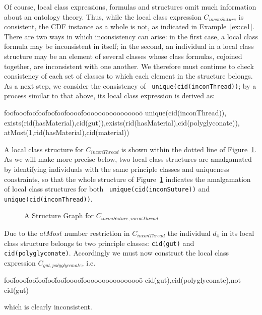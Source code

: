 \begin{example}
Of course, local class expressions, formulas and structures omit much
information about an ontology theory.  Thus, while the local class
expression $C_{inconSuture}$ is consistent, the CDF instance as a
whole is not, as indicated in Example~\ref{ex:ce1}.  There are two
ways in which inconsistency can arise: in the first case, a local
class formula may be inconsistent in itself; in the second, an
individual in a local class structure may be an element of several
classes whose class formulas, cojoined together, are inconsistent with
one another.  We therefore must continue to check consistency of each
set of classes to which each element in the structure belongs.  As a
next step, we consider the consistency of {\tt
unique(cid(inconThread))}; by a process similar to that above, its
local class expression is derived as:
{\it {\small
\begin{tabbing}
foo\=fooo\=foo\=foo\=foo\=foo\=foooo\=foooooooooooooooo\=\kill
\> unique(cid(inconThread)),\\
\>
exists(rid(hasMaterial),cid(gut)),exists(rid(hasMaterial),cid(polyglyconate)),\\
\> atMost(1,rid(hasMaterial),cid(material))
\end{tabbing}
} }
A local class structure for $C_{inconThread}$ is shown within the
dotted line of Figure~\ref{fig:struct2}.  As we will make more precise
below, two local class structures are amalgamated by identifying
individuals with the same principle classes and uniqueness
constraints, so that the whole structure of Figure~\ref{fig:struct2}
indicates the amalgamation of local class structures for both {\tt
unique(cid(inconSuture))} and {\tt unique(cid(inconThread))}.

\begin{figure}[htbp] \label{fig:struct2}
\caption{A Structure Graph for $C_{inconSuture,inconThread}$}
\end{figure}
Due to the $atMost$ number restriction in $C_{inconThread}$ the
individual $d_4$ in its local class structure belongs to two principle
classes: {\tt cid(gut)} and {\tt cid(polyglyconate)}.  Accordingly we
must now construct the local class expression
$C_{gut,polyglyconate}$, i.e.
{\it {\small
\begin{tabbing}
foo\=fooo\=foo\=foo\=foo\=foo\=foooo\=foooooooooooooooo\=\kill
\> cid(gut),cid(polyglyconate),not cid(gut) 
\end{tabbing}
} }
\noindent
which is clearly inconsistent.
\end{example}

